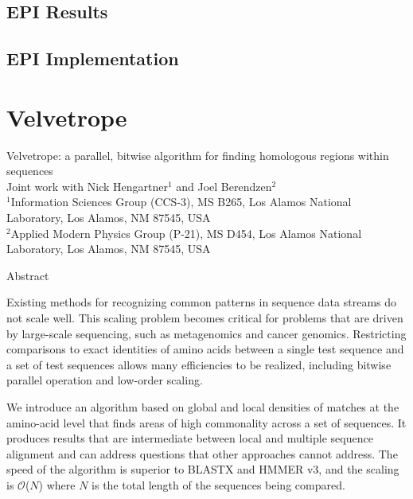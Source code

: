 \documentclass[phd,tocprelim]{cornell}
\begin{document}

\chapter{EPI Results} %
\label{cha:EPI Results}


\chapter{EPI Implementation} %
\label{cha:EPI Implementation}



\part{Velvetrope} %
\label{prt:Velvetrope}

\noindent
\Large
Velvetrope: a parallel, bitwise algorithm for finding homologous regions within sequences \\
\normalsize
Joint work with Nick Hengartner$^{1}$ and Joel Berendzen$^{2}$ \\
\scriptsize
$^{1}$Information Sciences Group (CCS-3), MS B265, Los Alamos National
 Laboratory, Los Alamos, NM 87545, USA \\
$^{2}$Applied Modern Physics Group (P-21), MS D454, Los Alamos National
 Laboratory, Los Alamos, NM 87545, USA
\normalsize

\begin{center}
   Abstract 
\end{center}

Existing methods for recognizing common patterns in sequence data
streams do not scale well. This scaling problem becomes critical for
problems that are driven by large-scale sequencing, such as
metagenomics and cancer genomics.  Restricting comparisons to exact
identities of amino acids between a single test sequence and a set of
test sequences allows many efficiencies to be realized, including
bitwise parallel operation and low-order scaling.

We introduce an algorithm based on global and local densities of
matches at the amino-acid level that finds areas of high commonality
across a set of sequences.  It produces results that are intermediate
between local and multiple sequence alignment and can address
questions that other approaches cannot address.  The speed of the
algorithm is superior to BLASTX and HMMER v3, and the scaling is
$\mathcal O$($N$) where $N$ is the total length of the sequences
being compared.
\end{document}
